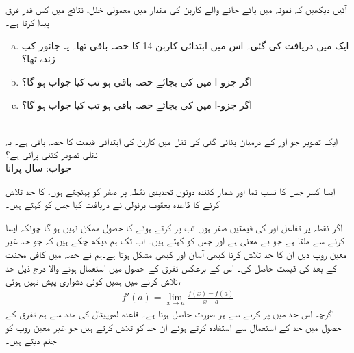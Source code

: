 \\
آئیں دیکھیں کہ نمونہ میں پائے جانے والے کاربن کی مقدار میں معمولی خلل، نتائج میں کس قدر فرق پیدا کرتا ہے۔
\begin{enumerate}[a.]
\item
ایک   میں دریافت کی گئی۔ اس میں ابتدائی کاربن 14 کا  حصہ باقی تھا۔ یہ جانور کب زندہ تھا؟
\item
اگر جزو-ا میں  کی بجائے  حصہ باقی ہو تب کیا جواب ہو گا؟
\item
اگر جزو-ا میں  کی بجائے  حصہ باقی ہو تب کیا جواب ہو گا؟
\end{enumerate}
\\
ایک تصویر جو  اور  کے درمیان بنائی گئی کی نقل میں کاربن  کی ابتدائی قیمت کا  حصہ باقی ہے۔ یہ نقلی تصویر کتنی پرانی ہے؟\\
جواب:\quad
{} سال پرانا

ایسا کسر جس کا نسب نما اور شمار کنندہ دونوں تحدیدی نقطہ پر  صفر کو پہنچتے ہوں، کا حد تلاش کرنے کا قاعدہ یعقوب برنولی نے دریافت کیا جس کو  کہتے ہیں۔

اگر نقطہ  پر تفاعل  اور  کی قیمتیں صفر ہوں تب  پر کرتے ہوئے   کا حصول ممکن نہیں ہو گا چونکہ ایسا کرنے سے  ملتا ہے جو بے معنی ہے اور  جس کو  کہتے ہیں۔ اب تک ہم دیکھ چکے ہیں کہ جو حد غیر معین روپ دیں ان کا حد تلاش کرنا کبھی آسان اور کبھی مشکل ہوتا ہے۔ہم نے حصہ  میں کافی محنت کے بعد  کی قیمت حاصل کی۔ اس کے برعکس تفرق کے حصول میں استعمال ہونے والا درج ذیل حد تلاش کرنے میں ہمیں کوئی دشواری پیش نہیں ہوئی،
\begin{align*}
f'(a)=\lim_{x\to a}\frac{f(x)-f(a)}{x-a}
\end{align*}
اگرچہ اس حد میں  پر کرنے سے ہر صورت  حاصل ہوتا ہے۔ قاعدہ لھوپیٹال  کی مدد سے ہم تفرق کے حصول میں حد کے استعمال سے استفادہ کرتے ہوئے ان حد کو تلاش کرتے ہیں جو غیر معین روپ کو جنم دیتے ہیں۔

